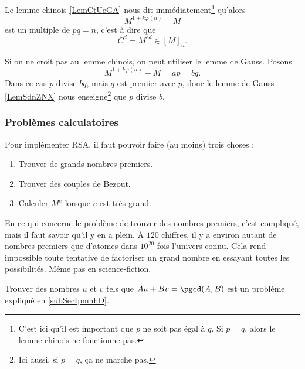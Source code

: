 Le lemme chinois \ref{LemCtUeGA} nous dit immédiatement\footnote{C'est ici qu'il est important que \( p\) ne soit pas égal à \( q\). Si \( p=q\), alors le lemme chinois ne fonctionne pas.} qu'alors
\begin{equation}
    M^{1+k\varphi(n)}-M
\end{equation}
est un multiple de \( pq=n\), c'est à dire que
\begin{equation}
    C^d=M^{ed}\in [M]_n.
\end{equation}

Si on ne croit pas au lemme chinois, on peut utiliser le lemme de Gauss. Posons
\begin{equation}
    M^{1+k\varphi(n)}-M=ap=bq.
\end{equation}
Dans ce cas \( p\) divise \( bq\), mais \( q\) est premier avec \( p\), donc le lemme de Gauss \ref{LemSdnZNX} nous enseigne\footnote{Ici aussi, si \( p=q\), ça ne marche pas.} que \( p\) divise \( b\).

\subsubsection{Problèmes calculatoires}

Pour implémenter RSA, il faut pouvoir faire (au moins) trois choses :
\begin{enumerate}
    \item
        Trouver de grands nombres premiers.
    \item
        Trouver des couples de Bezout.
    \item
        Calculer \( M^e\) lorsque \( e\) est très grand.
\end{enumerate}
En ce qui concerne le problème de trouver des nombres premiers, c'est compliqué, mais il faut savoir qu'il y en a plein. À \( 120\) chiffres, il y a environ autant de nombres premiers que d'atomes dans \( 10^{20}\) fois l'univers connu. Cela rend impossible toute tentative de factoriser un grand nombre en essayant toutes les possibilités. Même pas en science-fiction.

Trouver des nombres \( u\) et \( v\) tels que \( Au+Bv=\pgcd(A,B)\) est un problème expliqué en \ref{subSecIpmnhO}.

